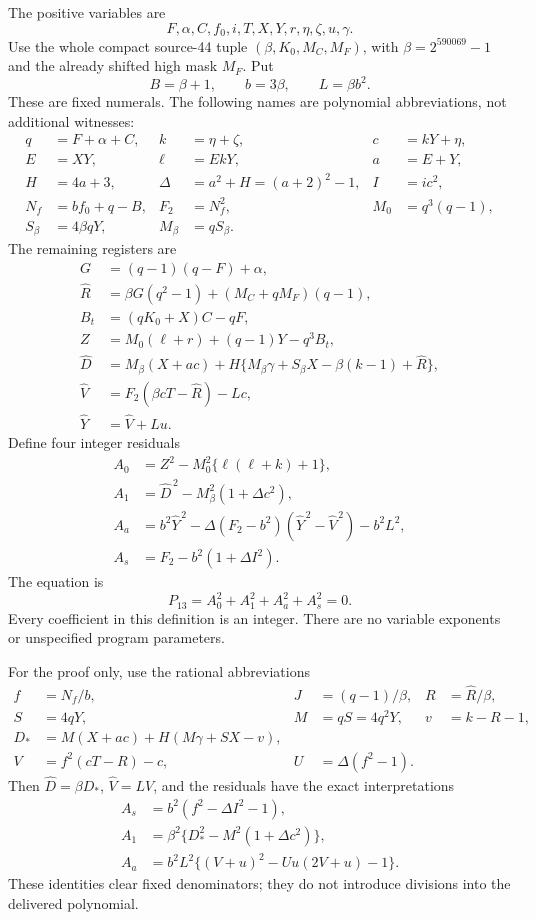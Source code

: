 The positive variables are
\[
 F,\alpha,C,f_0,i,T,X,Y,r,\eta,\zeta,u,\gamma.
\]
Use the whole compact source-44 tuple
$(\beta,K_0,M_C,M_F)$, with $\beta=2^{590069}-1$ and the already shifted
high mask $M_F$.  Put
\[
 B=\beta+1,\qquad b=3\beta,\qquad L=\beta b^2.
\]
These are fixed numerals.  The following names are polynomial abbreviations,
not additional witnesses:
\begin{align*}
 q&=F+\alpha+C,& k&=\eta+\zeta,&c&=kY+\eta,\\
 E&=XY,&\ell&=EkY,&a&=E+Y,\\
 H&=4a+3,&\Delta&=a^2+H=(a+2)^2-1,&I&=ic^2,\\
 N_f&=bf_0+q-B,&F_2&=N_f^2,&M_0&=q^3(q-1),\\
 S_\beta&=4\beta qY,&M_\beta&=qS_\beta.&&
\end{align*}
The remaining registers are
\begin{align*}
 G&=(q-1)(q-F)+\alpha,\\
 \widehat R&=\beta G(q^2-1)+(M_C+qM_F)(q-1),\\
 B_t&=(qK_0+X)C-qF,\\
 Z&=M_0(\ell+r)+(q-1)Y-q^3B_t,\\
 \widehat D&=M_\beta(X+ac)
       +H\{M_\beta\gamma+S_\beta X-\beta(k-1)+\widehat R\},\\
 \widehat V&=F_2(\beta cT-\widehat R)-Lc,\\
 \widehat Y&=\widehat V+Lu.
\end{align*}
Define four integer residuals
\begin{align}
 A_0&=Z^2-M_0^2\{\ell(\ell+k)+1\},\label{eq:new-first}\\
 A_1&=\widehat D^{\,2}-M_\beta^2(1+\Delta c^2),\label{eq:new-main}\\
 A_a&=b^2\widehat Y^{\,2}
       -\Delta(F_2-b^2)(\widehat Y^{\,2}-\widehat V^{\,2})-b^2L^2,
       \label{eq:new-aux}\\
 A_s&=F_2-b^2(1+\Delta I^2).\label{eq:new-strong}
\end{align}
The equation is
\begin{equation}
 \boxed{\;P_{13}=A_0^2+A_1^2+A_a^2+A_s^2=0.\;}
 \label{eq:new-p13}
\end{equation}
Every coefficient in this definition is an integer.  There are no variable
exponents or unspecified program parameters.

For the proof only, use the rational abbreviations
\begin{align*}
 f&=N_f/b,&J&=(q-1)/\beta,&R&=\widehat R/\beta,\\
 S&=4qY,&M&=qS=4q^2Y,&v&=k-R-1,\\
 D_*&=M(X+ac)+H(M\gamma+SX-v),&&&\\
 V&=f^2(cT-R)-c,&U&=\Delta(f^2-1).&&
\end{align*}
Then $\widehat D=\beta D_*$, $\widehat V=LV$, and the residuals have the
exact interpretations
\begin{align*}
 A_s&=b^2(f^2-\Delta I^2-1),\\
 A_1&=\beta^2\{D_*^2-M^2(1+\Delta c^2)\},\\
 A_a&=b^2L^2\{(V+u)^2-Uu(2V+u)-1\}.
\end{align*}
These identities clear fixed denominators; they do not introduce divisions
into the delivered polynomial.

